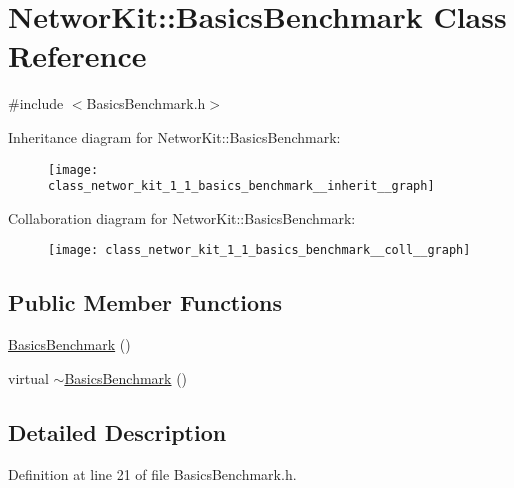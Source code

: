 \hypertarget{class_networ_kit_1_1_basics_benchmark}{\section{Networ\-Kit\-:\-:Basics\-Benchmark Class Reference}
\label{class_networ_kit_1_1_basics_benchmark}
}


{\ttfamily \#include $<$Basics\-Benchmark.\-h$>$}



Inheritance diagram for Networ\-Kit\-:\-:Basics\-Benchmark\-:\nopagebreak
\begin{figure}[H]
\begin{center}
\leavevmode
\texttt{[image: class\_networ\_kit\_1\_1\_basics\_benchmark\_\_inherit\_\_graph]}
\end{center}
\end{figure}


Collaboration diagram for Networ\-Kit\-:\-:Basics\-Benchmark\-:\nopagebreak
\begin{figure}[H]
\begin{center}
\leavevmode
\texttt{[image: class\_networ\_kit\_1\_1\_basics\_benchmark\_\_coll\_\_graph]}
\end{center}
\end{figure}
\subsection*{Public Member Functions}
\begin{DoxyCompactItemize}
\item 
\hyperlink{class_networ_kit_1_1_basics_benchmark_ad0d3519c5b7e4ca63e4df787ac5626fc}{Basics\-Benchmark} ()
\item 
virtual \hyperlink{class_networ_kit_1_1_basics_benchmark_acaf4cf386d34c49e7c09925c6402dae8}{$\sim$\-Basics\-Benchmark} ()
\end{DoxyCompactItemize}


\subsection{Detailed Description}


Definition at line 21 of file Basics\-Benchmark.\-h.



